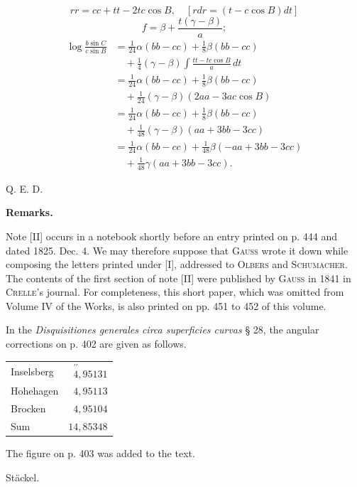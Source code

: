 %
\[
rr=cc+tt-2tc\cos B,\quad[rdr=(t-c\cos B)dt]
\]
\noindent [and]
\[
f=\beta+\frac{t(\gamma-\beta)}a;
\]
\[
\begin{aligned}
\log\frac{b\sin C}{c\sin B}&=\tfrac1{24}\alpha(bb-cc)+\tfrac18\beta(bb-cc)\\
&\quad+\tfrac14(\gamma-\beta)\int\frac{tt-tc\cos B}a\,dt\\
&=\tfrac1{24}\alpha(bb-cc)+\tfrac18\beta(bb-cc)\\
&\quad+\tfrac1{24}(\gamma-\beta)(2aa-3ac\cos B)\\
&=\tfrac1{24}\alpha(bb-cc)+\tfrac18\beta(bb-cc)\\
&\quad+\tfrac1{48}(\gamma-\beta)(aa+3bb-3cc)\\
&=\tfrac1{24}\alpha(bb-cc)+\tfrac1{48}\beta(-aa+3bb-3cc)\\
&\quad+\tfrac1{48}\gamma(aa+3bb-3cc).
\end{aligned}
\]
\begin{flushright}Q. E. D.\end{flushright}
\par{}\begin{center}\textbf{Remarks.}\end{center}
\noindent\hspace*{1.2em}Note [II] occurs in a notebook shortly before an entry printed on p. 444 and dated 1825. Dec. 4. We may therefore suppose that \textsc{Gauss} wrote it down while composing the letters printed under [I], addressed to \textsc{Olbers} and \textsc{Schumacher}. The contents of the first section of note [II] were published by \textsc{Gauss} in 1841 in \textsc{Crelle}'s journal. For completeness, this short paper, which was omitted from Volume IV of the Works, is also printed on pp. 451 to 452 of this volume.

In the \textit{Disquisitiones generales circa superficies curvas} § 28, the angular corrections on p. 402 are given as follows.
\begin{center}\begin{tabular}{lr}
Inselsberg & $\overset{\prime\prime}{4}{,}95131$\\
Hohehagen & $4{,}95113$\\
Brocken & $4{,}95104$\\
Sum & $14{,}85348$
\end{tabular}\end{center}
\noindent\hspace*{1.2em}The figure on p. 403 was added to the text.
\begin{flushright}Stäckel.\end{flushright}
